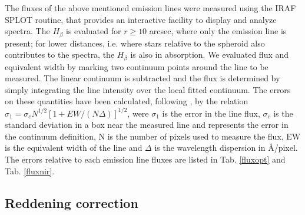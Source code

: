 \documentclass[12pt,preprint]{aastex}
\begin{document}
The fluxes of the above mentioned emission lines were measured using
the IRAF {\small SPLOT} routine, that provides an interactive facility
to display and analyze spectra. The $H_{\beta}$ is evaluated for $r
\geq 10$ arcsec, where only the emission line is present; for lower
distances, i.e. where stars relative to the spheroid also contributes
to the spectra, the $H_{\beta}$ is also in absorption. We evaluated
flux and equivalent width by marking two continuum points around the
line to be measured.  The linear continuum is subtracted and the flux
is determined by simply integrating the line intensity over the local
fitted continuum. The errors on these quantities have been calculated,
following \citet{Per03}, by the relation $\sigma_{1} =
\sigma_{c}N^{1/2}[1+EW/(N\Delta)]^{1/2}$, were $\sigma_{1}$ is the
error in the line flux, $\sigma_{c}$ is the standard deviation in a
box near the measured line and represents the error in the continuum
definition, N is the number of pixels used to measure the flux, EW is
the equivalent width of the line and $\Delta$ is the wavelength
dispersion in \AA/pixel. The errors relative to each emission line
fluxes are listed in Tab. \ref{fluxopt} and Tab. \ref{fluxnir}.





\subsection{Reddening correction}\label{reddening}
\end{document}
